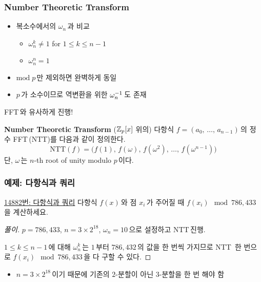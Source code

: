 \begin{frame}
    \frametitle{Number Theoretic Transform}

    \begin{itemize}
        \item 복소수에서의 \(\omega_n\)\,과 비교
              \begin{itemize}
                  \item \(\omega_n^k \neq 1\) for \(1 \leq k \leq n - 1\)
                  \item \(\omega_n^n = 1\)
              \end{itemize} \pause
        \item \(\mathrm{mod}\;p\)\,만 제외하면 완벽하게 동일 \pause
        \item \(p\)\,가 소수이므로 역변환을 위한 \(\omega_n^{-1}\)\,도 존재 \pause
    \end{itemize}

    FFT\,와 유사하게 진행!

    \begin{block}{\textbf{Number Theoretic Transform}}
        (\(\mathbb{Z}_p[x]\) 위의) 다항식 \(f = (a_0,\, \dots,\, a_{n-1})\)\,의 \alert{정수 FFT}\,(NTT)를 다음과 같이 정의한다.
        \[
            \mathrm{NTT}(f) = \big(f(1),\, f(\omega),\, f(\omega^2),\, \dots,\, f(\omega^{n - 1})\big)
        \]
        단, \(\omega\)\,는 \(n\)-th root of unity modulo \(p\)\,이다.
    \end{block}
\end{frame}

\begin{frame}
    \frametitle{예제: 다항식과 쿼리}

    \begin{exampleblock}{\href{https://www.acmicpc.net/problem/14882}{14882번: 다항식과 쿼리}}
        다항식 \(f(x)\)\,와 점 \(x_i\)\,가 주어질 때 \(f(x_i)\!\!\mod{786,433}\)\,을 계산하세요.
    \end{exampleblock}

    \pause

    \begin{proof}[풀이]
        \(p = 786,433\), \(n = 3 \times 2^{18}\), \(\omega_n = 10\)\,으로 설정하고 NTT\,진행. \pause

        \medskip

        \(1 \leq k \leq n - 1\)\,에 대해 \(\omega_n^k\)\,는 \(1\)\,부터 \(786,432\)\,의 값을 한 번씩 가지므로 NTT\, 한 번으로 \(f(x_i)\!\!\mod{786,433}\)\,을 다 구할 수 있다.
    \end{proof}

    \pause
    \begin{itemize}
        \item \(n = 3 \times 2^{18}\)\,이기 때문에 기존의 \(2\)-분할이 아닌 \(3\)-분할을 한 번 해야 함
    \end{itemize}
\end{frame}
